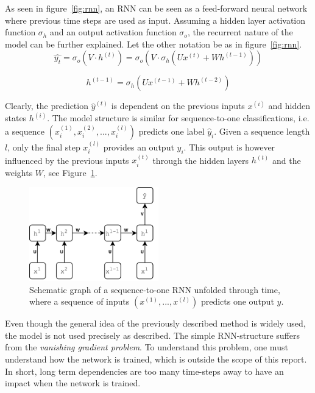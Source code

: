             As seen in figure~\ref{fig:rnn}, an RNN can be seen as a feed-forward neural network where previous time steps are used as input. 
            Assuming a hidden layer activation function $\sigma_h$ and an output activation function $\sigma_o$, the recurrent nature of the model can be further explained. 
            Let the other notation be as in figure~\ref{fig:rnn}. 
            \begin{equation}
                \hat{y_t} = \sigma_o(V \cdot h^{(t)}) = \sigma_o(V \cdot  \sigma_h(U x^{(t)} + W h^{(t-1)}))
            \end{equation}

            \begin{equation}
                h^{(t-1)} = \sigma_h(Ux^{(t-1)} + W h^{(t-2)})
            \end{equation}


            Clearly, the prediction $\hat{y}^{(t)}$ is dependent on the previous inputs $x^{(i)}$ and hidden states $h^{(i)}$. 
            The model structure is similar for sequence-to-one classifications, i.e. a sequence $(x_i^{(1)}, x_i^{(2)}, ..., x_i^{(l)})$ predicts one label $\hat{y}_i$. 
            Given a sequence length $l$, only the final step $x_i^{(l)}$ provides an output $y_i$. 
            This output is however influenced by the previous inputs $x_i^{(t)}$ through the hidden layers $h^{(t)}$ and the weights $W$, see Figure~\ref{fig:rnns2o}. 

            \begin{figure}[t]
                \centering
                \includegraphics[width=0.5\textwidth]{figures/rnn-s2o.png}
                \caption{Schematic graph of a sequence-to-one RNN unfolded through time, where a sequence of inputs $(x^{(1)}, ..., x^{(l)})$ predicts one output $y$.}
                \label{fig:rnns2o}
            \end{figure}

            Even though the general idea of the previously described method is widely used, the model is not used precisely as described. 
            The simple RNN-structure suffers from the \textit{vanishing gradient problem}. 
            To understand this problem, one must understand how the network is trained, which is outside the scope of this report. 
            In short, long term dependencies are too many time-steps away to have an impact when the network is trained. 

